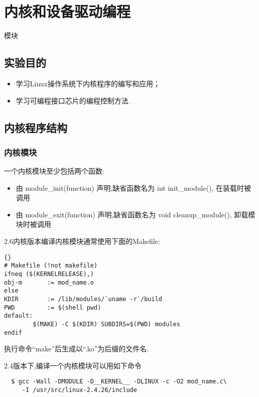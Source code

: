 \chapter{内核和设备驱动编程}{模块}

\section{实验目的}
\begin{itemize}\itemsep=-3pt
  \item 学习Linux操作系统下内核程序的编写和应用；
  \item 学习可编程接口芯片的编程控制方法.
\end{itemize}

\section{内核程序结构}
\subsection{内核模块}	
	一个内核模块至少包括两个函数:
\begin{itemize}\itemsep=-3pt
  \item 由 module\_init(function) 声明,缺省函数名为 int init\_module(),
		在装载时被调用
  \item 由 module\_exit(function) 声明,缺省函数名为 void cleanup\_module(),
		卸载模块时被调用
\end{itemize}

    2.6内核版本编译内核模块通常使用下面的Makefile:

\begin{boxedminipage}{.9\textwidth}
\lstset{language=make}
\begin{lstlisting}{}
# Makefile (!not makefile)
ifneq ($(KERNELRELEASE),)
obj-m       := mod_name.o
else
KDIR        := /lib/modules/`uname -r`/build
PWD         := $(shell pwd)
default:
        $(MAKE) -C $(KDIR) SUBDIRS=$(PWD) modules
endif
\end{lstlisting}
\end{boxedminipage}

执行命令``make''后生成以``.ko''为后缀的文件名.

	2.4版本下,编译一个内核模块可以用如下命令

\begin{boxedminipage}{.9\textwidth}
\begin{verbatim}
  $ gcc -Wall -DMODULE -D__KERNEL__ -DLINUX -c -O2 mod_name.c\
     -I /usr/src/linux-2.4.26/include
\end{verbatim}
\end{boxedminipage}

